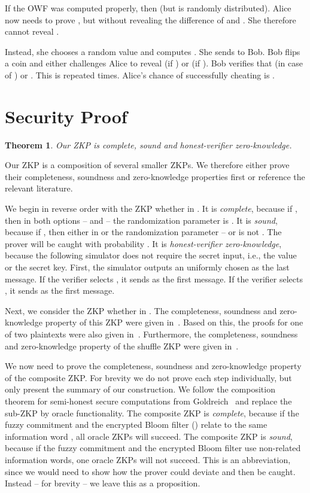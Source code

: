 \documentclass{llncs}
\newtheorem{thm}{Theorem}
\begin{document}
If the OWF was computed properly, then  (but  is randomly distributed).
Alice now needs to prove , but without revealing the difference of  and .
She therefore cannot reveal .

Instead, she chooses a random value  and computes .
She sends  to Bob.
Bob flips a coin  and either challenges Alice to reveal  (if ) or  (if ).
Bob verifies that  (in case of ) or .
This is repeated  times.
Alice's chance of successfully cheating is .

\section{Security Proof}
\label{sec:proof}

\begin{thm}
Our ZKP is complete, sound and honest-verifier zero-knowledge.
\end{thm}

Our ZKP is a composition of several smaller ZKPs.
We therefore either prove their completeness, soundness and zero-knowledge properties first or reference the relevant literature.

We begin in reverse order with the ZKP whether  in .
It is {\em complete}, because if , then in both options --  and  -- the randomization parameter is .
It is {\em sound}, because if , then either in  or  the randomization parameter --  or  is not .
The prover will be caught with probability .
It is {\em honest-verifier zero-knowledge}, because the following simulator does not require the secret input, i.e., the value  or the secret key.
First, the simulator outputs an uniformly chosen  as the last message.
If the verifier selects , it sends  as the first message.
If the verifier selects , it sends  as the first message.

Next, we consider the ZKP whether  in .
The completeness, soundness and zero-knowledge property of this ZKP were given in~\cite{DamJur01}.
Based on this, the proofs for one of two plaintexts were also given in~\cite{DamJur01}.
Furthermore, the completeness, soundness and zero-knowledge property of the shuffle ZKP were given in~\cite{Gro10}.

We now need to prove the completeness, soundness and zero-knowledge property of the composite ZKP.
For brevity we do not prove each step individually, but only present the summary of our construction.
We follow the composition theorem for semi-honest secure computations from Goldreich~\cite{Gol04} and replace the sub-ZKP by oracle functionality.
The composite ZKP is {\em complete}, because if the fuzzy commitment  and the encrypted Bloom filter  () relate to the same information word , all oracle ZKPs will succeed.
The composite ZKP is {\em sound}, because if the fuzzy commitment  and the encrypted Bloom filter  use non-related information words, one oracle ZKPs will not succeed.
This is an abbreviation, since we would need to show how the prover could deviate and then be caught.
Instead -- for brevity -- we leave this as a proposition.
\end{document}
